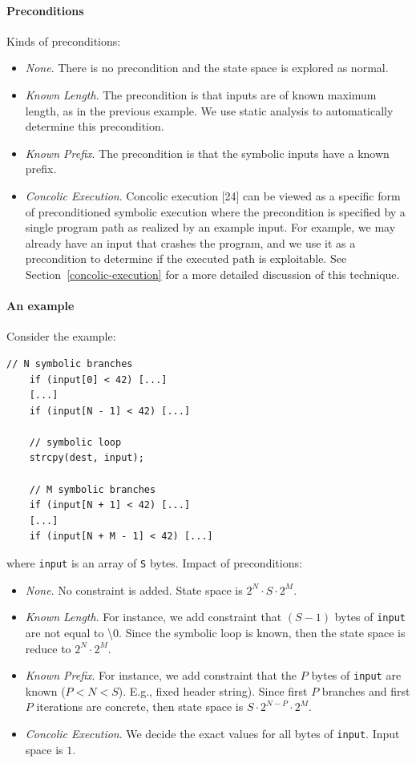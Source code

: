 \documentclass[10pt, a4paper]{article}
\begin{document}
\paragraph{Preconditions} Kinds of preconditions:
\begin{itemize}
  \item {\em None}. There is no precondition and the state space is explored as normal.
  \item {\em Known Length}. The precondition is that inputs are of known maximum length, as in the previous example. We use static analysis to automatically determine this precondition.
  \item {\em Known Prefix}. The precondition is that the symbolic inputs have a known prefix.
  \item {\em Concolic Execution}. Concolic execution [24] can be viewed as a specific form of preconditioned symbolic execution where the precondition is specified by a single program path as realized by an example input. For example, we may already have an input that crashes the program, and we use it as a precondition to determine if the executed path is exploitable. See Section~\ref{concolic-execution} for a more detailed discussion of this technique.
\end{itemize}

\paragraph{An example} Consider the example:

\begin{lstlisting}[basicstyle=\ttfamily\small]
    // N symbolic branches 
    if (input[0] < 42) [...]
    [...]
    if (input[N - 1] < 42) [...]

    // symbolic loop
    strcpy(dest, input); 

    // M symbolic branches
    if (input[N + 1] < 42) [...]
    [...]
    if (input[N + M - 1] < 42) [...]
    \end{lstlisting}
where {\tt input} is an array of {\tt S} bytes. Impact of preconditions:
\begin{itemize}
  \item {\em None}. No constraint is added. State space is $2^N \cdot S \cdot 2^M$.
  \item {\em Known Length}. For instance, we add constraint that $(S - 1)$ bytes of {\tt input} are not equal to \textbackslash0. Since the symbolic loop is known, then the state space is reduce to $2^N \cdot 2^M$.
  \item {\em Known Prefix}. For instance, we add constraint that the $P$ bytes of {\tt input} are known ($P < N < S$). E.g., fixed header string). Since first $P$ branches and first $P$ iterations are concrete, then state space is $S \cdot 2^{N-P} \cdot 2^M$.
  \item {\em Concolic Execution}. We decide the exact values for all bytes of {\tt input}. Input space is $1$.
\end{itemize}
\end{document}
